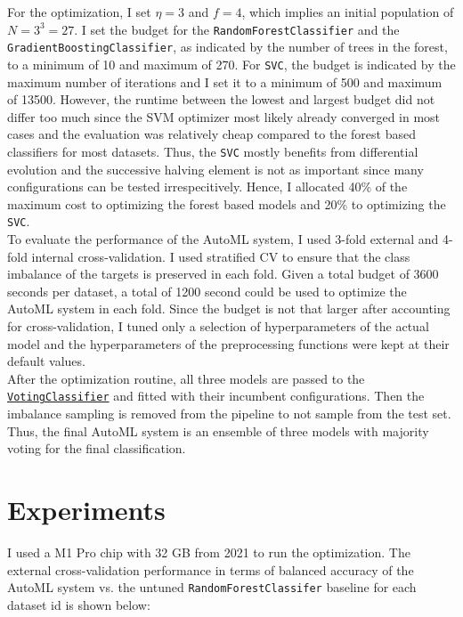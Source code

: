 \documentclass[11pt]{article}
\begin{document}
For the optimization, I set $\eta=3$ and $f=4$, which implies an initial population of $N=3^{3}=27$. I set the budget for the \texttt{RandomForestClassifier} and the \texttt{GradientBoostingClassifier}, as indicated by the number of trees in the forest, to a minimum of 10 and maximum of 270. For \texttt{SVC}, the budget is indicated by the maximum number of iterations and I set it to a minimum of 500 and maximum of 13500. However, the runtime between the lowest and largest budget did not differ too much since the SVM optimizer most likely already converged in most cases and the evaluation was relatively cheap compared to the forest based classifiers for most datasets. Thus, the \texttt{SVC} mostly benefits from differential evolution and the successive halving element is not as important since many configurations can be tested irrespecitively. Hence, I allocated 40\% of the maximum cost to optimizing the forest based models and 20\% to optimizing the \texttt{SVC}. \\

To evaluate the performance of the AutoML system, I used 3-fold external and 4-fold internal cross-validation. I used stratified CV to ensure that the class imbalance of the targets is preserved in each fold. Given a total budget of 3600 seconds per dataset, a total of 1200 second could be used to optimize the AutoML system in each fold. Since the budget is not that larger after accounting for cross-validation, I tuned only a selection of hyperparameters of the actual model and the hyperparameters of the preprocessing functions were kept at their default values. \\

After the optimization routine, all three models are passed to the \href{https://scikit-learn.org/stable/modules/generated/sklearn.ensemble.VotingClassifier.html}{\texttt{VotingClassifier}} and fitted with their incumbent configurations. Then the imbalance sampling is removed from the pipeline to not sample from the test set. Thus, the final AutoML system is an ensemble of three models with majority voting for the final classification. 

\section{Experiments}

I used a M1 Pro chip with 32 GB from 2021 to run the optimization. The external cross-validation performance in terms of balanced accuracy of the AutoML system vs. the untuned \texttt{RandomForestClassifer} baseline for each dataset id is shown below:
\end{document}
